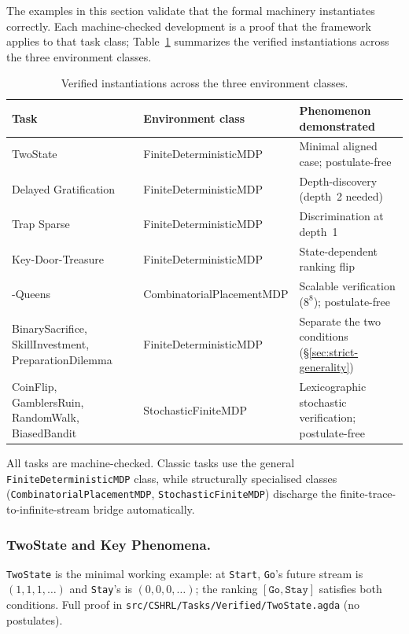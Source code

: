 \documentclass[runningheads]{llncs}
\newcommand{\fpath}[1]{\nolinkurl{#1}}
\begin{document}
The examples in this section validate that the formal machinery instantiates correctly.  Each machine-checked development is a proof that the framework applies to that task class; Table~\ref{tab:tasks} summarizes the verified instantiations across the three environment classes.

\begin{table}[t]
\centering
\caption{Verified instantiations across the three environment classes.}
\label{tab:tasks}
\footnotesize
\begin{tabularx}{\textwidth}{@{}>{\raggedright\arraybackslash}X >{\raggedright\arraybackslash}p{} >{\raggedright\arraybackslash}X@{}}
\toprule
\textbf{Task} & \textbf{Environment class} & \textbf{Phenomenon demonstrated} \\
\midrule
TwoState & Finite\-Deterministic\-MDP & Minimal aligned case; postulate-free \\
Delayed Gratification & Finite\-Deterministic\-MDP & Depth-discovery (depth~2 needed) \\
Trap Sparse & Finite\-Deterministic\-MDP & Discrimination at depth~1 \\
Key-Door-Treasure & Finite\-Deterministic\-MDP & State-dependent ranking flip \\
8-Queens & Combinatorial\-Placement\-MDP & Scalable verification ($8^8$); postulate-free \\
BinarySacrifice, SkillInvestment, PreparationDilemma & Finite\-Deterministic\-MDP & Separate the two conditions (\S\ref{sec:strict-generality}) \\
CoinFlip, GamblersRuin, RandomWalk, BiasedBandit & Stochastic\-Finite\-MDP & Lexicographic stochastic verification; postulate-free \\
\bottomrule
\end{tabularx}
\end{table}

All tasks are machine-checked.  Classic tasks use the general \texttt{FiniteDeterministicMDP} class, while structurally specialised classes (\texttt{CombinatorialPlacementMDP}, \texttt{StochasticFiniteMDP}) discharge the finite-trace-to-infinite-stream bridge automatically.

\subsubsection{TwoState and Key Phenomena.}

\texttt{TwoState} is the minimal working example: at \texttt{Start}, \texttt{Go}'s future stream is $(1,1,1,\dots)$ and \texttt{Stay}'s is $(0,0,0,\dots)$; the ranking $[\texttt{Go}, \texttt{Stay}]$ satisfies both conditions.  Full proof in \fpath{src/CSHRL/Tasks/Verified/TwoState.agda} (no postulates).
\end{document}
